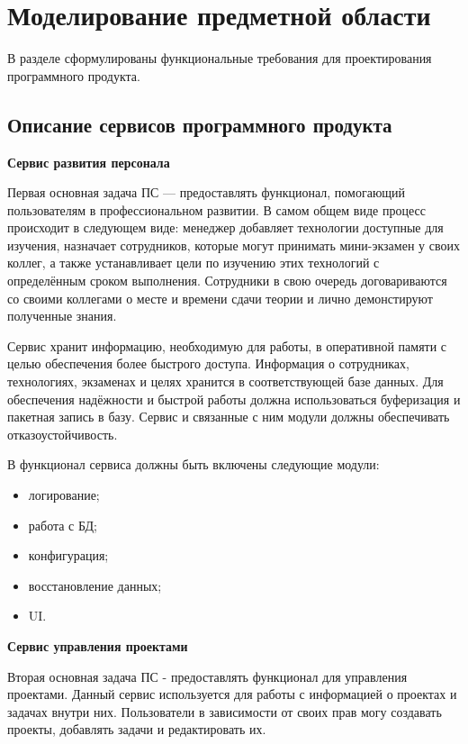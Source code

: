 \section{Моделирование предметной области}\label{sec:domain}

В разделе сформулированы функциональные требования для проектирования программного продукта.

\subsection{Описание сервисов программного продукта}\label{sec:domain:service}

\textbf{Сервис развития персонала}

Первая основная задача ПС — предоставлять функционал, помогающий пользователям в профессиональном развитии. В самом общем виде процесс происходит в следующем виде: менеджер добавляет технологии доступные для изучения, назначает сотрудников, которые могут принимать мини-экзамен у своих коллег, а также устанавливает цели по изучению этих технологий с определённым сроком выполнения. Сотрудники в свою очередь договариваются со своими коллегами о месте и времени сдачи теории и лично демонстируют полученные знания.

Сервис хранит информацию, необходимую для работы, в оперативной памяти с целью обеспечения более быстрого доступа. Информация о сотрудниках, технологиях, экзаменах и целях хранится в соответствующей базе данных. Для обеспечения надёжности и быстрой работы должна использоваться буферизация и пакетная запись в базу. Сервис и связанные с ним модули должны обеспечивать отказоустойчивость.

В функционал сервиса должны быть включены следующие модули:
\begin{itemize}
    \item логирование;
    \item работа с БД;
    \item конфигурация;
    \item восстановление данных;
    \item UI.
\end{itemize}

\bigskip
\textbf{Сервис управления проектами}

Вторая основная задача ПС - предоставлять функционал для управления проектами. Данный сервис используется для работы с информацией о проектах и задачах внутри них. Пользователи в зависимости от своих прав могу создавать проекты, добавлять задачи и редактировать их.

